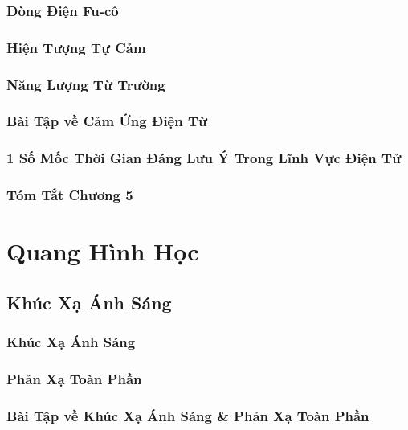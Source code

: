 \documentclass[oneside]{book}
\numberwithin{equation}{section}
\begin{document}
\section{Dòng Điện Fu-cô}

\section{Hiện Tượng Tự Cảm}

\section{Năng Lượng Từ Trường}

\section{Bài Tập về Cảm Ứng Điện Từ}

\section{1 Số Mốc Thời Gian Đáng Lưu Ý Trong Lĩnh Vực Điện Tử}

\section{Tóm Tắt Chương 5}


\part{Quang Hình Học}

\chapter{Khúc Xạ Ánh Sáng}

\section{Khúc Xạ Ánh Sáng}

\section{Phản Xạ Toàn Phần}

\section{Bài Tập về Khúc Xạ Ánh Sáng \& Phản Xạ Toàn Phần}
\end{document}
